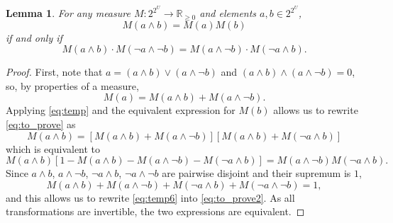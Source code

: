 \documentclass{article}
\newtheorem{lemma}{Lemma}
\theoremstyle{definition}
\theoremstyle{remark}
\begin{document}
\begin{lemma} \label{lemma:before_theorem}
  For any measure $M\colon 2^{2^U} \to \mathbb{R}_{\ge 0}$ and elements $a, b
  \in 2^{2^U}$,
  \begin{equation} \label{eq:to_prove}
    M(a \land b) = M(a)M(b)
  \end{equation}
  if and only if
  \begin{equation} \label{eq:to_prove2}
    M(a \land b) \cdot M(\neg a \land \neg b) = M(a \land \neg b)
    \cdot M(\neg a \land b).
  \end{equation}
\end{lemma}
\begin{proof}
  First, note that $a = (a \land b) \lor (a \land \neg b)$ and $(a \land b)
  \land (a \land \neg b) = 0$, so, by properties of a measure,
  \begin{equation} \label{eq:temp}
    M(a) = M(a \land b) + M(a \land \neg b).
  \end{equation}
  Applying \cref{eq:temp} and the equivalent expression for $M(b)$ allows us
  to rewrite \cref{eq:to_prove} as
  \[
    M(a \land b) = [M(a \land b) + M(a \land \neg b)][M(a \land b) + M(\neg a
    \land b)]
  \]
  which is equivalent to
  \begin{equation} \label{eq:temp6}
    M(a \land b)[1 - M(a \land b) - M(a \land \neg b) - M(\neg a \land b)] = M(a
    \land \neg b)M(\neg a \land b).
  \end{equation}
  Since $a \land b$, $a \land \neg b$, $\neg a \land b$, $\neg a \land \neg b$
  are pairwise disjoint and their supremum is $1$,
  \[
    M(a \land b) + M(a \land \neg b) + M(\neg a \land b) + M(\neg a \land \neg
    b) = 1,
  \]
  and this allows us to rewrite \cref{eq:temp6} into \cref{eq:to_prove2}. As all
  transformations are invertible, the two expressions are equivalent.
\end{proof}
\end{document}
